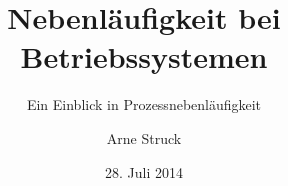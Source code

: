 \documentclass{beamer}
\title{Nebenläufigkeit bei Betriebssystemen}
\subtitle{Ein Einblick in Prozessnebenläufigkeit}
\author{Arne Struck}
\institute{Universität Hamburg}
\date{28. Juli 2014}
\begin{document}
\begin{frame}[plain]
	\maketitle
\end{frame}



\end{document}
